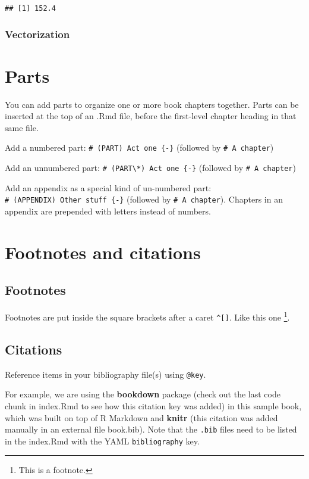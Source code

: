 \documentclass[
]{book}
\theoremstyle{definition}
\theoremstyle{definition}
\theoremstyle{definition}
\theoremstyle{definition}
\theoremstyle{remark}
\begin{document}
\begin{verbatim}
## [1] 152.4
\end{verbatim}

\hypertarget{vectorization}{%
\subsection{Vectorization}\label{vectorization}}

\hypertarget{parts}{%
\chapter{Parts}\label{parts}}

You can add parts to organize one or more book chapters together. Parts can be inserted at the top of an .Rmd file, before the first-level chapter heading in that same file.

Add a numbered part: \texttt{\#\ (PART)\ Act\ one\ \{-\}} (followed by \texttt{\#\ A\ chapter})

Add an unnumbered part: \texttt{\#\ (PART\textbackslash{}*)\ Act\ one\ \{-\}} (followed by \texttt{\#\ A\ chapter})

Add an appendix as a special kind of un-numbered part: \texttt{\#\ (APPENDIX)\ Other\ stuff\ \{-\}} (followed by \texttt{\#\ A\ chapter}). Chapters in an appendix are prepended with letters instead of numbers.

\hypertarget{footnotes-and-citations}{%
\chapter{Footnotes and citations}\label{footnotes-and-citations}}

\hypertarget{footnotes}{%
\section{Footnotes}\label{footnotes}}

Footnotes are put inside the square brackets after a caret \texttt{\^{}{[}{]}}. Like this one \footnote{This is a footnote.}.

\hypertarget{citations}{%
\section{Citations}\label{citations}}

Reference items in your bibliography file(s) using \texttt{@key}.

For example, we are using the \textbf{bookdown} package \citep{R-bookdown} (check out the last code chunk in index.Rmd to see how this citation key was added) in this sample book, which was built on top of R Markdown and \textbf{knitr} \citep{xie2015} (this citation was added manually in an external file book.bib).
Note that the \texttt{.bib} files need to be listed in the index.Rmd with the YAML \texttt{bibliography} key.
\end{document}
